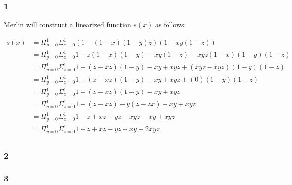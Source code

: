 \documentclass[letterpaper,notitlepage,twoside]{article}
\begin{document}
\subsubsection*{1}
Merlin will construct a linearized function $s(x)$ as follows:

\begin{align*}
s(x) &= \Pi_{y = 0}^1\Sigma_{z = 0}^1 (1 - (1 - x)(1 - y)z)(1 - xy(1 - z)) \\
     &= \Pi_{y = 0}^1\Sigma_{z = 0}^1 1 - z(1 - x)(1 - y) - xy(1 - z) + xyz(1 - x)(1 - y)(1 - z) \\
     &= \Pi_{y = 0}^1\Sigma_{z = 0}^1 1 - (z - xz)(1 - y) - xy + xyz + (xyz - xyz)(1 - y)(1 - z) \\
     &= \Pi_{y = 0}^1\Sigma_{z = 0}^1 1 - (z - xz)(1 - y) - xy + xyz + (0)(1 - y)(1 - z) \\
     &= \Pi_{y = 0}^1\Sigma_{z = 0}^1 1 - (z - xz)(1 - y) - xy + xyz \\
     &= \Pi_{y = 0}^1\Sigma_{z = 0}^1 1 - (z - xz) - y(z - zx) - xy + xyz \\
     &= \Pi_{y = 0}^1\Sigma_{z = 0}^1 1 - z + xz - yz + xyz - xy + xyz \\
     &= \Pi_{y = 0}^1\Sigma_{z = 0}^1 1 - z + xz - yz - xy + 2xyz \\
\end{align*}

\subsubsection*{2}
\subsubsection*{3}
\end{document}
